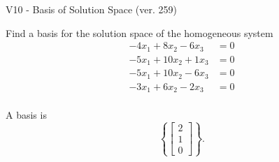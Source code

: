 \begin{exercise}
  \begin{exerciseTitle}V10 - Basis of Solution Space (ver. 259)\end{exerciseTitle}
  \begin{exerciseStatement}
    Find a basis for the solution space of the homogeneous system 
\begin{align*}
 -4 x_ 1 + 8 x_ 2 -6 x_ 3 &= 0  \\ 
  -5 x_ 1 + 10 x_ 2 + 1 x_ 3 &= 0  \\ 
  -5 x_ 1 + 10 x_ 2 -6 x_ 3 &= 0  \\ 
  -3 x_ 1 + 6 x_ 2 -2 x_ 3 &= 0  \\ 
 \end{align*}


 
  \end{exerciseStatement}

  \begin{exerciseAnswer}
   A basis is   
\[\left\{\left[\begin{array}{c}
2 \\
1 \\
0
\end{array}\right]\right\}.\]

  


  \end{exerciseAnswer}
\end{exercise}